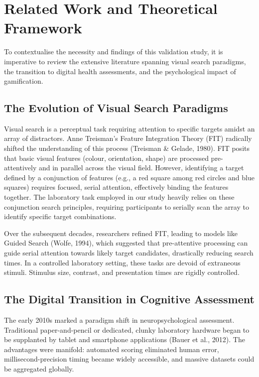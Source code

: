 \documentclass[11pt,a4paper]{article}
\begin{document}
\section{Related Work and Theoretical Framework}
\label{sec:related_work}

To contextualise the necessity and findings of this validation study, it is imperative to review the extensive literature spanning visual search paradigms, the transition to digital health assessments, and the psychological impact of gamification.

\subsection{The Evolution of Visual Search Paradigms}
Visual search is a perceptual task requiring attention to specific targets amidst an array of distractors. Anne Treisman’s Feature Integration Theory (FIT) radically shifted the understanding of this process (Treisman \& Gelade, 1980). FIT posits that basic visual features (colour, orientation, shape) are processed pre-attentively and in parallel across the visual field. However, identifying a target defined by a conjunction of features (e.g., a red square among red circles and blue squares) requires focused, serial attention, effectively binding the features together. The laboratory task employed in our study heavily relies on these conjunction search principles, requiring participants to serially scan the array to identify specific target combinations.

Over the subsequent decades, researchers refined FIT, leading to models like Guided Search (Wolfe, 1994), which suggested that pre-attentive processing can guide serial attention towards likely target candidates, drastically reducing search times. In a controlled laboratory setting, these tasks are devoid of extraneous stimuli. Stimulus size, contrast, and presentation times are rigidly controlled.

\subsection{The Digital Transition in Cognitive Assessment}
The early 2010s marked a paradigm shift in neuropsychological assessment. Traditional paper-and-pencil or dedicated, clunky laboratory hardware began to be supplanted by tablet and smartphone applications (Bauer et al., 2012). The advantages were manifold: automated scoring eliminated human error, millisecond-precision timing became widely accessible, and massive datasets could be aggregated globally.
\end{document}
